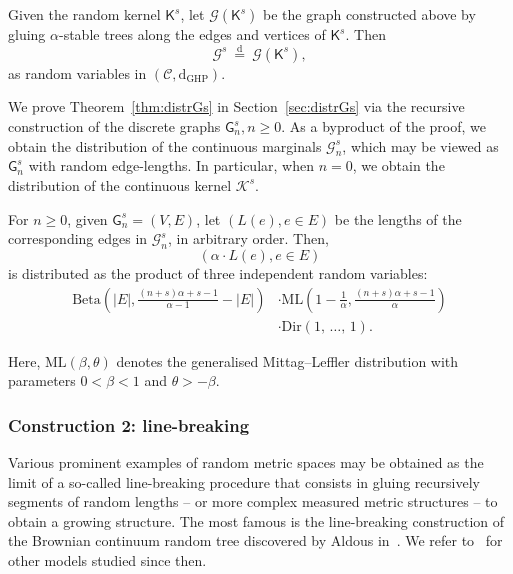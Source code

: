 \documentclass[AHL,Unicode,longabstracts,published]{cedram}
\newcommand{\Betal}{\mathrm{Beta}}
\newcommand{\ML}{\mathrm{ML}}
\newcommand{\GHP}{\mathrm{GHP}}
\newcommand{\rmd}{\mathrm{d}}
\newcommand{\Dir}{\mathrm{Dir}}
\newcommand{\cG}{\mathcal{G}}
\newcommand{\cK}{\mathcal{K}}
\newcommand{\sG}{\mathsf{G}}
\newcommand{\sK}{\mathsf{K}}
\newcommand{\scrC}{\mathscr{C}}
\begin{document}

\begin{theo}\label{thm:distrGs}
Given the random kernel $\sK^s$, let $\cG(\sK^s)$ be the graph constructed above by gluing $\alpha$-stable trees along the edges and vertices of $\sK^s$. Then
\[
\cG^s \ \overset{\rmd}= \ \cG(\sK^s),
\]
as random variables in $(\scrC,\rmd_{\GHP})$.
\end{theo}

We prove Theorem~\ref{thm:distrGs} in Section~\ref{sec:distrGs} via the recursive construction of the discrete graphs $\sG_n^s,n \geq 0$. As a byproduct of the proof, we obtain the distribution of the continuous marginals $\cG_n^s$, which may be viewed as $\sG_n^s$ with random edge-lengths. In particular, when $n=0$, we obtain the distribution of the continuous kernel $\cK^s$.

\begin{prop}\label{cor:lengthskernel}
For $n \geq 0$, given $\sG_n^s=(V,E)$, let $(L(e), e \in E)$ be the lengths of the corresponding edges in $\cG_n^s$, in arbitrary order. Then,
\[
\left(\alpha \cdot L(e), e \in E \right)
\]
is distributed as the product of three independent random variables:
\begin{equation}\label{ref:BMLD}
\begin{split}
\Betal\left(|E|,\frac{(n+s)\alpha+s-1}{\alpha-1}-|E|\right) &\cdot \ML\left(1-\frac{1}{\alpha}, \frac{(n+s)\alpha+s-1}{\alpha} \right)\\
 &\cdot \Dir(1,\,\ldots,\,1).
\end{split}
\end{equation}
\end{prop}

Here, $\ML(\beta,\theta)$ denotes the generalised Mittag--Leffler distribution with parameters $0 < \beta < 1$ and $\theta > -\beta$.

\subsubsection{Construction 2: line-breaking}\label{cons2:LB}

Various prominent examples of random metric spaces may be obtained as the limit of a so-called line-breaking procedure that consists in gluing recursively segments of random lengths -- or more complex measured metric structures -- to obtain a growing structure. The most famous is the line-breaking construction of the Brownian continuum random tree discovered by Aldous in~\cite{AldousCRT1}. We refer to~\cite{ABBrGo, CH14, GHlinebreaking, RW16, Sen17, Sen19+_scaling} for other models studied since then.
\end{document}
